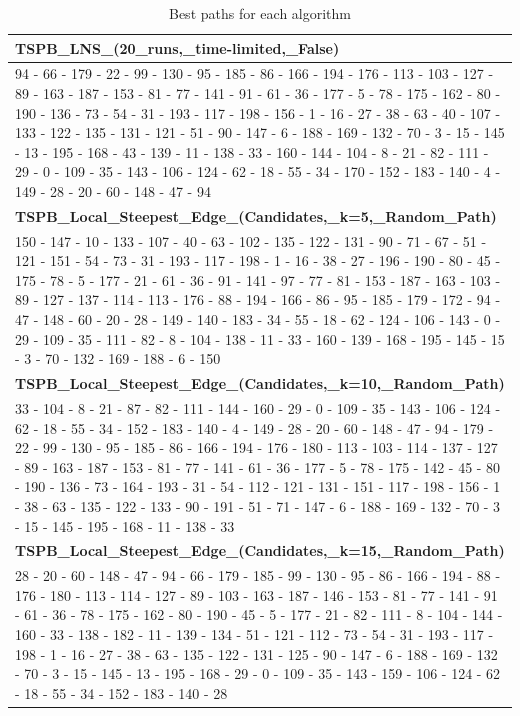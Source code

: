 \begin{table}[h!]
\begin{tabular}{|p{14cm}|}
\textbf{TSPB\_LNS\_(20\_runs,\_time-limited,\_False)} \\ \hline
94 - 66 - 179 - 22 - 99 - 130 - 95 - 185 - 86 - 166 - 194 - 176 - 113 - 103 - 127 - 89 - 163 - 187 - 153 - 81 - 77 - 141 - 91 - 61 - 36 - 177 - 5 - 78 - 175 - 162 - 80 - 190 - 136 - 73 - 54 - 31 - 193 - 117 - 198 - 156 - 1 - 16 - 27 - 38 - 63 - 40 - 107 - 133 - 122 - 135 - 131 - 121 - 51 - 90 - 147 - 6 - 188 - 169 - 132 - 70 - 3 - 15 - 145 - 13 - 195 - 168 - 43 - 139 - 11 - 138 - 33 - 160 - 144 - 104 - 8 - 21 - 82 - 111 - 29 - 0 - 109 - 35 - 143 - 106 - 124 - 62 - 18 - 55 - 34 - 170 - 152 - 183 - 140 - 4 - 149 - 28 - 20 - 60 - 148 - 47 - 94 \\ \hline
\textbf{TSPB\_Local\_Steepest\_Edge\_(Candidates,\_k=5,\_Random\_Path)} \\ \hline
150 - 147 - 10 - 133 - 107 - 40 - 63 - 102 - 135 - 122 - 131 - 90 - 71 - 67 - 51 - 121 - 151 - 54 - 73 - 31 - 193 - 117 - 198 - 1 - 16 - 38 - 27 - 196 - 190 - 80 - 45 - 175 - 78 - 5 - 177 - 21 - 61 - 36 - 91 - 141 - 97 - 77 - 81 - 153 - 187 - 163 - 103 - 89 - 127 - 137 - 114 - 113 - 176 - 88 - 194 - 166 - 86 - 95 - 185 - 179 - 172 - 94 - 47 - 148 - 60 - 20 - 28 - 149 - 140 - 183 - 34 - 55 - 18 - 62 - 124 - 106 - 143 - 0 - 29 - 109 - 35 - 111 - 82 - 8 - 104 - 138 - 11 - 33 - 160 - 139 - 168 - 195 - 145 - 15 - 3 - 70 - 132 - 169 - 188 - 6 - 150 \\ \hline
\textbf{TSPB\_Local\_Steepest\_Edge\_(Candidates,\_k=10,\_Random\_Path)} \\ \hline
33 - 104 - 8 - 21 - 87 - 82 - 111 - 144 - 160 - 29 - 0 - 109 - 35 - 143 - 106 - 124 - 62 - 18 - 55 - 34 - 152 - 183 - 140 - 4 - 149 - 28 - 20 - 60 - 148 - 47 - 94 - 179 - 22 - 99 - 130 - 95 - 185 - 86 - 166 - 194 - 176 - 180 - 113 - 103 - 114 - 137 - 127 - 89 - 163 - 187 - 153 - 81 - 77 - 141 - 61 - 36 - 177 - 5 - 78 - 175 - 142 - 45 - 80 - 190 - 136 - 73 - 164 - 193 - 31 - 54 - 112 - 121 - 131 - 151 - 117 - 198 - 156 - 1 - 38 - 63 - 135 - 122 - 133 - 90 - 191 - 51 - 71 - 147 - 6 - 188 - 169 - 132 - 70 - 3 - 15 - 145 - 195 - 168 - 11 - 138 - 33 \\ \hline
\textbf{TSPB\_Local\_Steepest\_Edge\_(Candidates,\_k=15,\_Random\_Path)} \\ \hline
28 - 20 - 60 - 148 - 47 - 94 - 66 - 179 - 185 - 99 - 130 - 95 - 86 - 166 - 194 - 88 - 176 - 180 - 113 - 114 - 127 - 89 - 103 - 163 - 187 - 146 - 153 - 81 - 77 - 141 - 91 - 61 - 36 - 78 - 175 - 162 - 80 - 190 - 45 - 5 - 177 - 21 - 82 - 111 - 8 - 104 - 144 - 160 - 33 - 138 - 182 - 11 - 139 - 134 - 51 - 121 - 112 - 73 - 54 - 31 - 193 - 117 - 198 - 1 - 16 - 27 - 38 - 63 - 135 - 122 - 131 - 125 - 90 - 147 - 6 - 188 - 169 - 132 - 70 - 3 - 15 - 145 - 13 - 195 - 168 - 29 - 0 - 109 - 35 - 143 - 159 - 106 - 124 - 62 - 18 - 55 - 34 - 152 - 183 - 140 - 28 \\ \hline
\end{tabular}
\caption{Best paths for each algorithm}
\end{table}